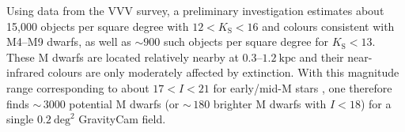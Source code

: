 \documentclass{pasa}%
\begin{document}
Using data from the VVV  \citep[VISTA Variables in Via  L\'actea,][]{2010NewA...15..433M}  survey, a preliminary investigation  \citep{2014A&A...571A..36R} estimates about 15,000 objects per square degree with
 $12< K_\mathrm{S} < 16$ and colours consistent with M4--M9 dwarfs, as well as  $\sim 900$ such objects per square degree for $K_\mathrm{S} < 13$. These M dwarfs are located relatively nearby at $0.3$--$1.2~\mbox{kpc}$ and their near-infrared colours are only moderately affected by extinction. With this magnitude range corresponding to about $17< I < 21$ for early/mid-M stars \citep{2013ApJS..208....9P}, one therefore finds $\sim\,3000$ potential M dwarfs (or $\sim\,180$ brighter M dwarfs with $I < 18$) for a single $0.2~\mbox{deg}^2$ GravityCam field.





\end{document}
